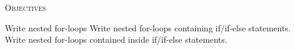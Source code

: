 
\textsc{Objectives}
 \begin{myenum}
   \li Write nested for-loops
   \li Write nested for-loops containing if/if-else statements.
   \li Write nested for-loops contained inside if/if-else statements.
 \end{myenum}
